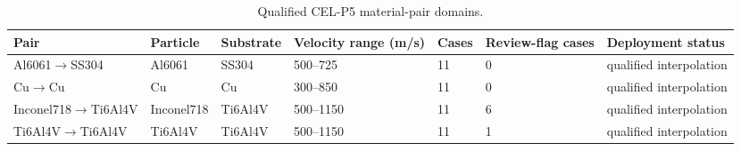 \begin{table}[t]
\centering
\caption{Qualified CEL-P5 material-pair domains.}
\label{tab:qualified_domains}
\begin{tabular}{lllllll}
\hline
Pair & Particle & Substrate & Velocity range (m/s) & Cases & Review-flag cases & Deployment status \\
\hline
Al6061$\rightarrow$SS304 & Al6061 & SS304 & 500–725 & 11 & 0 & qualified interpolation \\
Cu$\rightarrow$Cu & Cu & Cu & 300–850 & 11 & 0 & qualified interpolation \\
Inconel718$\rightarrow$Ti6Al4V & Inconel718 & Ti6Al4V & 500–1150 & 11 & 6 & qualified interpolation \\
Ti6Al4V$\rightarrow$Ti6Al4V & Ti6Al4V & Ti6Al4V & 500–1150 & 11 & 1 & qualified interpolation \\
\hline
\end{tabular}
\end{table}
